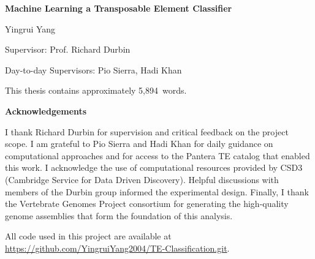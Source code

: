 \documentclass[12pt]{article}
\newcommand\wordcount{5,894}
\begin{document}
\begin{titlepage}
    \centering
    \vspace*{2cm}
    
    {\LARGE\bfseries Machine Learning a Transposable Element Classifier\par}
    
    \vspace{3cm}
    
    {\Large Yingrui Yang\par}
    
    \vspace{3cm}
    
    {\large 
    Supervisor: Prof. Richard Durbin\par
    \vspace{0.5cm}
    Day-to-day Supervisors: Pio Sierra, Hadi Khan\par
    }
    
    \vfill
    
    {\normalsize This thesis contains approximately \wordcount\ words.\par}
    
    \vspace{1.5cm}

    \begin{flushleft}
    {\normalsize\bfseries Acknowledgements\par}
    \vspace{0.3cm}
    {\small I thank Richard Durbin for supervision and critical feedback on the project scope. I am grateful to Pio Sierra and Hadi Khan for daily guidance on computational approaches and for access to the Pantera TE catalog that enabled this work. I acknowledge the use of computational resources provided by CSD3 (Cambridge Service for Data Driven Discovery). Helpful discussions with members of the Durbin group informed the experimental design. Finally, I thank the Vertebrate Genomes Project consortium for generating the high-quality genome assemblies that form the foundation of this analysis.\par
    
    \small All code used in this project are available at \url{https://github.com/YingruiYang2004/TE-Classification.git}. \par}
    \end{flushleft}

    \vspace{1cm}
    
\end{titlepage}
\end{document}
